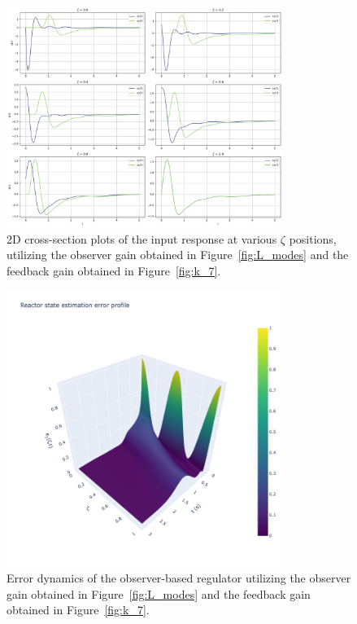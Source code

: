 \begin{figure}[!htbp]
    \centering
    \includegraphics[width=0.8\textwidth]{Figures/2D_xt_L_k7.png}
    \caption{2D cross-section plots of the input response at various $\zeta$ positions, utilizing the observer gain obtained in Figure~\ref{fig:L_modes} and the feedback gain obtained in Figure~\ref{fig:k_7}.}
    \label{fig:2D_xt_L_k7}
\end{figure}

\begin{figure}[!htbp]
    \centering
    \includegraphics[width=0.8\textwidth,trim=0 0 100 0,clip]{Figures/3D_e1_L_k7.png}
    \caption{Error dynamics of the observer-based regulator utilizing the observer gain obtained in Figure~\ref{fig:L_modes} and the feedback gain obtained in Figure~\ref{fig:k_7}.}
    \label{fig:3D_e1_L_k7}
\end{figure}

